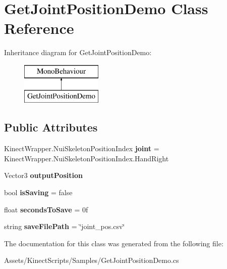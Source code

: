 \hypertarget{class_get_joint_position_demo}{}\section{Get\+Joint\+Position\+Demo Class Reference}
\label{class_get_joint_position_demo}
Inheritance diagram for Get\+Joint\+Position\+Demo\+:\begin{figure}[H]
\begin{center}
\leavevmode
\includegraphics[height=2.000000cm]{class_get_joint_position_demo}
\end{center}
\end{figure}
\subsection*{Public Attributes}
\begin{DoxyCompactItemize}
\item 
\mbox{\label{class_get_joint_position_demo_a2f1433fb9f5277878a276beee5d9c44b}} 
Kinect\+Wrapper.\+Nui\+Skeleton\+Position\+Index {\bfseries joint} = Kinect\+Wrapper.\+Nui\+Skeleton\+Position\+Index.\+Hand\+Right
\item 
\mbox{\label{class_get_joint_position_demo_aed3f43661ae874b501e952946525ede7}} 
Vector3 {\bfseries output\+Position}
\item 
\mbox{\label{class_get_joint_position_demo_a410f993a82c4a0efa8264feec6ec4dde}} 
bool {\bfseries is\+Saving} = false
\item 
\mbox{\label{class_get_joint_position_demo_a17dea2adb7bf2ba7f7ac9ba017f9a4a4}} 
float {\bfseries seconds\+To\+Save} = 0f
\item 
\mbox{\label{class_get_joint_position_demo_a6ad9df96efa58c4bd47775606df9cf68}} 
string {\bfseries save\+File\+Path} = \char`\"{}joint\+\_\+pos.\+csv\char`\"{}
\end{DoxyCompactItemize}


The documentation for this class was generated from the following file\+:\begin{DoxyCompactItemize}
\item 
Assets/\+Kinect\+Scripts/\+Samples/Get\+Joint\+Position\+Demo.\+cs\end{DoxyCompactItemize}
